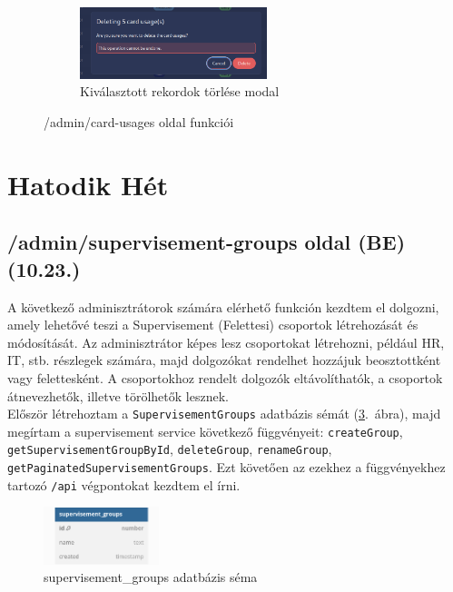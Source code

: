 \documentclass[a4paper]{article}
\newcommand{\inltxt}[1]{\texttt{#1}}
\begin{document}
\begin{figure}[ht]
    \vspace{1em} %

    \begin{subfigure}[c]{0.8\textwidth}
        \centering
        \includegraphics[width=0.6\textwidth]{images/card_usages_delete.png}
        \caption{Kiválasztott rekordok törlése modal}
        \label{fig:card_usages_delete}
    \end{subfigure}

    \caption{/admin/card-usages oldal funkciói}
    \label{fig:manage_card_usages}
\end{figure}

\section{Hatodik Hét}

\subsection{/admin/supervisement-groups oldal (BE) (10.23.)}

A következő adminisztrátorok számára elérhető funkción kezdtem el dolgozni, amely lehetővé teszi a
Supervisement (Felettesi) csoportok létrehozását és módosítását. Az adminisztrátor képes lesz
csoportokat létrehozni, például HR, IT, stb. részlegek számára, majd dolgozókat rendelhet hozzájuk
beosztottként vagy felettesként. A csoportokhoz rendelt dolgozók eltávolíthatók, a csoportok
átnevezhetők, illetve törölhetők lesznek.\\

Először létrehoztam a \inltxt{SupervisementGroups} adatbázis sémát (\ref{fig:sup_groups_schema}.~ábra), majd megírtam a supervisement
service következő függvényeit: \inltxt{createGroup}, \inltxt{getSupervisementGroupById}, \inltxt{deleteGroup},
\inltxt{renameGroup}, \inltxt{getPaginatedSupervisementGroups}. Ezt követően az ezekhez a
függvényekhez tartozó \inltxt{/api} végpontokat kezdtem el írni.

\begin{figure}[ht]
  \centering
  \includegraphics[width = 0.3\textwidth]{images/sup_groups_schema.png}
  \caption{supervisement\_groups adatbázis séma}
  \label{fig:sup_groups_schema}
\end{figure}
\end{document}
